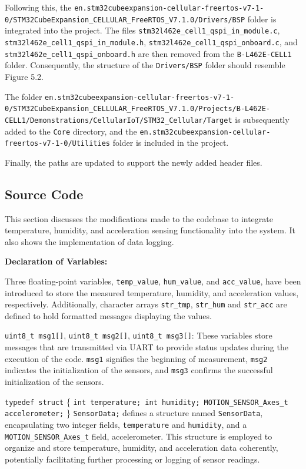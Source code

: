 \begin{sloppypar}
Following this, the \lstinline{en.stm32cubeexpansion-cellular-freertos-v7-1-0/STM32CubeExpansion_CELLULAR_FreeRTOS_V7.1.0/Drivers/BSP} folder is integrated into the project. The files \lstinline{stm32l462e_cell1_qspi_in_module.c}, \lstinline{stm32l462e_cell1_qspi_in_module.h}, \lstinline{stm32l462e_cell1_qspi_onboard.c}, and \lstinline{stm32l462e_cell1_qspi_onboard.h} are then removed from the \lstinline{B-L462E-CELL1} folder. Consequently, the structure of the \lstinline{Drivers/BSP} folder should resemble Figure 5.2.

The folder \lstinline{en.stm32cubeexpansion-cellular-freertos-v7-1-0/STM32CubeExpansion_CELLULAR_FreeRTOS_V7.1.0/Projects/B-L462E-CELL1/Demonstrations/CellularIoT/STM32_Cellular/Target} is subsequently added to the \lstinline{Core} directory, and the \lstinline{en.stm32cubeexpansion-cellular-freertos-v7-1-0/Utilities} folder is included in the project.

Finally, the paths are updated to support the newly added header files.
\end{sloppypar}

\subsection{Source Code}

This section discusses the modifications made to the codebase to integrate temperature, humidity, and acceleration sensing functionality into the system. It also shows the implementation of data logging.

\textbf{Declaration of Variables:}

Three floating-point variables, \lstinline{temp_value}, \lstinline{hum_value}, and \lstinline{acc_value}, have been introduced to store the measured temperature, humidity, and acceleration values, respectively.
Additionally, character arrays \lstinline{str_tmp}, \lstinline{str_hum} and \lstinline{str_acc} are defined to hold formatted messages displaying the values.

\lstinline{uint8_t msg1[]}, \lstinline{uint8_t msg2[]}, \lstinline{uint8_t msg3[]}: These variables store messages that are transmitted via UART to provide status updates during the execution of the code. \lstinline{msg1} signifies the beginning of measurement, \lstinline{msg2} indicates the initialization of the sensors, and \lstinline{msg3} confirms the successful initialization of the sensors.

\lstinline{typedef struct} \{ \lstinline{int temperature; int humidity; MOTION_SENSOR_Axes_t accelerometer;} \} \lstinline{SensorData;} defines a structure named \lstinline{SensorData}, encapsulating two integer fields, \lstinline{temperature} and \lstinline{humidity}, and a \lstinline{MOTION_SENSOR_Axes_t} field, accelerometer. This structure is employed to organize and store temperature, humidity, and acceleration data coherently, potentially facilitating further processing or logging of sensor readings.

